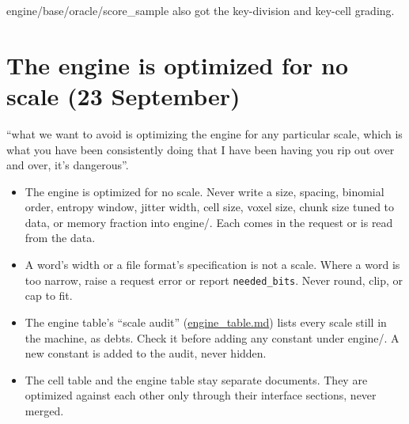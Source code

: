engine/base/oracle/score\_\allowbreak{}sample also got the key-division and key-cell grading.

\section{\texorpdfstring{The engine is optimized for no scale (23 September)}{The engine is optimized for no scale (23 September)}}

“what we want to avoid is optimizing the engine for any particular scale, which is what you have been consistently doing that I have been having you rip out over and over, it's dangerous”.

\begin{itemize}
\item The engine is optimized for no scale. Never write a size, spacing, binomial order, entropy window, jitter width, cell size, voxel size, chunk size tuned to data, or memory fraction into engine/. Each comes in the request or is read from the data.
\item A word's width or a file format's specification is not a scale. Where a word is too narrow, raise a request error or report \texttt{needed\_\allowbreak{}bits}. Never round, clip, or cap to fit.
\item The engine table's “scale audit” (\hyperref[chap:engine-table]{engine\_\allowbreak{}table.md}) lists every scale still in the machine, as debts. Check it before adding any constant under engine/. A new constant is added to the audit, never hidden.
\item The cell table and the engine table stay separate documents. They are optimized against each other only through their interface sections, never merged.
\end{itemize}
